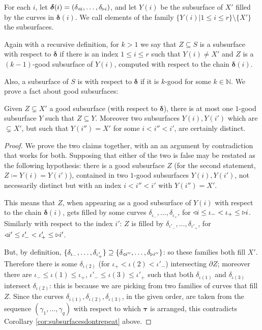 For each $i$, let $\bm\delta(i)=(\delta_{\triangleleft i},\ldots,\delta_{\triangleright i})$, and let $Y(i)$ be the subsurface of $X'$ filled by the curves in $\bm\delta(i)$. We call elements of the family $\{Y(i)|1\leq i\leq r\}\setminus\{X'\}$ the  subsurfaces.

Again with a recursive definition, for $k>1$ we say that $Z\subseteq S$ is a  subsurface with respect to $\bm\delta$ if there is an index $1\leq i\leq r$ such that $Y(i)\not=X'$ and $Z$ is a $(k-1)$-good subsurface of $Y(i)$, computed with respect to the chain $\bm\delta(i)$.

Also, a subsurface of $S$ is  with respect to $\bm\delta$ if it is $k$-good for some $k\in\mathbb N$. We prove a fact about good subsurfaces:

\begin{claim}
Given $Z\subsetneq X'$ a good subsurface (with respect to $\bm\delta$), there is at most one $1$-good subsurface $Y$ such that $Z\subseteq Y$. Moreover two subsurfaces $Y(i),Y(i')$ which are $\subsetneq X'$, but such that $Y(i'')=X'$ for some $i<i''<i'$, are certainly distinct.
\end{claim}

\begin{proof}
We prove the two claims together, with an an argument by contradiction that works for both. Supposing that either of the two is false may be restated as the following hypothesis: there is a good subsurface $Z$ (for the second statement, $Z\coloneqq Y(i)=Y(i')$), contained in two $1$-good subsurfaces $Y(i),Y(i')$, not necessarily distinct but with an index $i<i''<i'$ with $Y(i'')=X'$. 

This means that $Z$, when appearing as a good subsurface of $Y(i)$ with respect to the chain $\bm\delta(i)$, gets filled by some curves $\delta_{\iota_-},\ldots,\delta_{\iota_+}$, for $\triangleleft i\leq \iota_-< \iota_+ \leq \triangleright i$. Similarly with respect to the index $i'$: $Z$ is filled by $\delta_{\iota'_-},\ldots,\delta_{\iota'_+}$, for $\triangleleft i'\leq \iota'_-< \iota'_+ \leq \triangleright i'$.

But, by definition, $\{\delta_{\iota_-},\ldots,\delta_{\iota'_+}\}\supseteq \{\delta_{\triangleleft i''},\ldots,\delta_{\triangleright i''}\}$: so these families both fill $X'$. Therefore there is some $\delta_{\iota(2)}$ (for $\iota_+< \iota(2)< \iota'_-$) intersecting $\partial Z$; moreover there are $\iota_-\leq\iota(1)\leq\iota_+$, $\iota'_-\leq\iota(3)\leq\iota'_+$ such that both $\delta_{\iota(1)}$ and $\delta_{\iota(3)}$ intersect $\delta_{\iota(2)}$: this is because we are picking from two families of curves that fill $Z$. Since the curves $\delta_{\iota(1)}, \delta_{\iota(2)}, \delta_{\iota(3)}$, in the given order, are taken from the sequence $(\gamma_1,\ldots,\gamma_q)$ with respect to which $\bm\tau$ is arranged, this contradicts Corollary \ref{cor:subsurfacesdontrepeat} above.
\end{proof}

